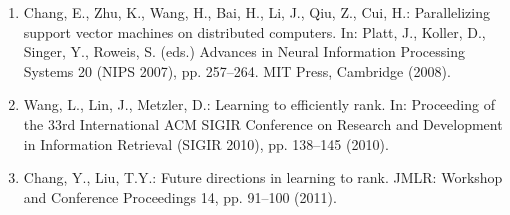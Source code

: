 \documentclass[12pt,a4paper,oneside]{article}
\begin{document}
\begin{enumerate}
	\item Chang, E., Zhu, K., Wang, H., Bai, H., Li, J., Qiu, Z., Cui, H.: Parallelizing support vector machines on distributed computers. In: Platt, J., Koller, D., Singer, Y., Roweis, S. (eds.) Advances in Neural Information Processing Systems 20 (NIPS 2007), pp. 257–264. MIT Press, Cambridge (2008).
	\item Wang, L., Lin, J., Metzler, D.: Learning to efficiently rank. In: Proceeding of the 33rd International ACM SIGIR Conference on Research and Development in Information Retrieval (SIGIR 2010), pp. 138–145 (2010).
	\item Chang, Y., Liu, T.Y.: Future directions in learning to rank. JMLR: Workshop and Conference Proceedings 14, pp. 91–100 (2011).
\end{enumerate}
\end{document}
